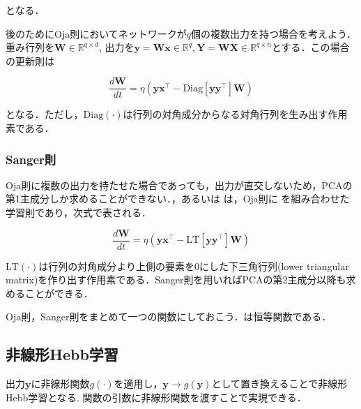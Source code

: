となる．



後のためにOja則においてネットワークが$q$個の複数出力を持つ場合を考えよう．重み行列を$\mathbf{W} \in \mathbb{R}^{q\times d}$, 出力を$\mathbf{y}=\mathbf{W}\mathbf{x} \in \mathbb{R}^{q}, \mathbf{Y}=\mathbf{W}\mathbf{X} \in \mathbb{R}^{q\times n}$とする．この場合の更新則は


\begin{equation}
\frac{d\mathbf{W}}{dt} = \eta \left(\mathbf{y}\mathbf{x}^\top - \mathrm{Diag}\left[\mathbf{y}\mathbf{y}^\top\right] \mathbf{W}\right)
\end{equation}


となる．ただし，$\mathrm{Diag}(\cdot)$は行列の対角成分からなる対角行列を生み出す作用素である．
\subsubsection{Sanger則}
Oja則に複数の出力を持たせた場合であっても，出力が直交しないため，PCAの第1主成分しか求めることができない．\textbf{}，あるいは\textbf{} は，Oja則に\textbf{} を組み合わせた学習則であり，次式で表される．


\begin{equation}
\frac{d\mathbf{W}}{dt} = \eta \left(\mathbf{y}\mathbf{x}^\top - \mathrm{LT}\left[\mathbf{y}\mathbf{y}^\top\right] \mathbf{W}\right)
\end{equation}


$\mathrm{LT}(\cdot)$は行列の対角成分より上側の要素を0にした下三角行列(lower triangular matrix)を作り出す作用素である．Sanger則を用いればPCAの第2主成分以降も求めることができる．



Oja則，Sanger則をまとめて一つの関数にしておこう．は恒等関数である．

\subsection{非線形Hebb学習}
出力$\mathbf{y}$に非線形関数$g(\cdot)$を適用し，$\mathbf{y}\to g(\mathbf{y})$として置き換えることで非線形Hebb学習となる\cite{Oja1997-hr}\cite{Brito2016-mx}. 関数の引数に非線形関数を渡すことで実現できる．

